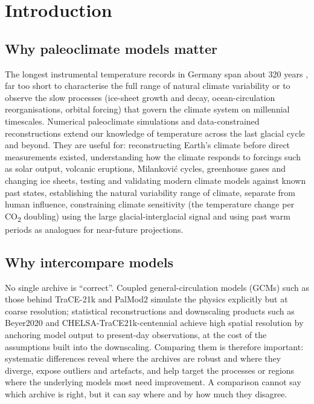 \documentclass{isprs}
\begin{document}
\maketitle

\pagestyle{plain}

\sloppy


\section{Introduction}

\subsection{Why paleoclimate models matter}
The longest instrumental temperature records in Germany span about 320 years \cite{dwd_temp}, far too short to characterise the full range of natural climate variability or to observe the slow processes (ice-sheet growth and decay, ocean-circulation reorganisations, orbital forcing) that govern the climate system on millennial timescales. Numerical paleoclimate simulations and data-constrained reconstructions extend our knowledge of temperature across the last glacial cycle and beyond. They are useful for: reconstructing Earth's climate before direct measurements existed, understanding how the climate responds to forcings such as solar output, volcanic eruptions, Milankovi\'c cycles, greenhouse gases and changing ice sheets, testing and validating modern climate models against known past states, establishing the natural variability range of climate, separate from human influence, constraining climate sensitivity (the temperature change per CO\textsubscript{2} doubling) using the large glacial-interglacial signal and using past warm periods as analogues for near-future projections.

\subsection{Why intercompare models}
No single archive is ``correct''. Coupled general-circulation models (GCMs) such as those behind TraCE-21k and PalMod2 simulate the physics explicitly but at coarse resolution; statistical reconstructions and downscaling products such as Beyer2020 and CHELSA-TraCE21k-centennial achieve high spatial resolution by anchoring model output to present-day observations, at the cost of the assumptions built into the downscaling. Comparing them is therefore important: systematic differences reveal where the archives are robust and where they diverge, expose outliers and artefacts, and help target the processes or regions where the underlying models most need improvement. A comparison cannot say which archive is right, but it can say where and by how much they disagree.
\end{document}
